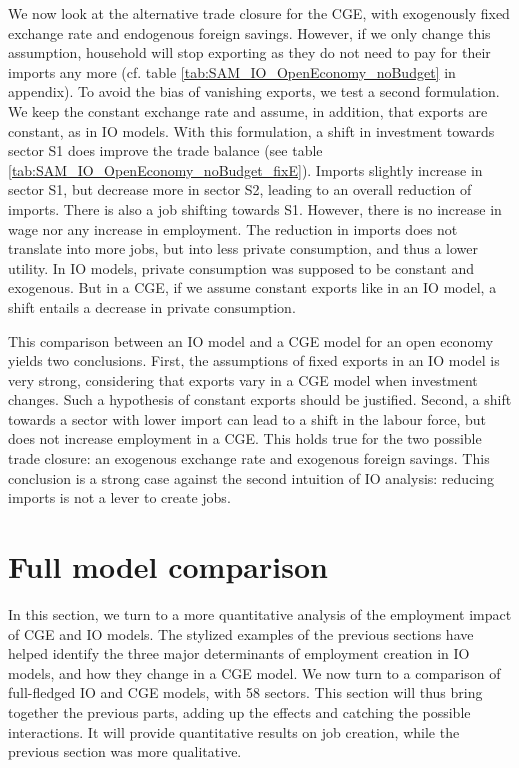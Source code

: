 We now look at the alternative trade closure for the CGE, with exogenously fixed exchange rate and endogenous foreign savings. However, if we only change this assumption, household will stop exporting as they do not need to pay for their imports any more (cf. table \ref{tab:SAM_IO_OpenEconomy_noBudget} in appendix). 
To avoid the bias of vanishing exports, we test a second formulation. We keep the constant exchange rate and assume, in addition, that exports are constant, as in IO models. With this formulation, a shift in investment towards sector S1 does improve the trade balance (see table \ref{tab:SAM_IO_OpenEconomy_noBudget_fixE}). 
Imports slightly increase in sector S1, but decrease more in sector S2, leading to an overall reduction of imports. There is also a job shifting towards S1.
However, there is no increase in wage nor any increase in employment. The reduction in imports does not translate into more jobs, but into less private consumption, and thus a lower utility.
In IO models, private consumption was supposed to be constant and exogenous. But in a CGE, if we assume constant exports like in an IO model, a shift entails a decrease in private consumption.

This comparison between an IO model and a CGE model for an open economy yields two conclusions. 
First, the assumptions of fixed exports in an IO model is very strong, considering that exports vary in a CGE model when investment changes. Such a hypothesis of constant exports should be justified. 
Second, a shift towards a sector with lower import can lead to a shift in the labour force, but does not increase employment in a CGE. This holds true for the two possible trade closure: an exogenous exchange rate and exogenous foreign savings.
This conclusion is a strong case against the second intuition of IO analysis: reducing imports is not a lever to create jobs. 


\section{Full model comparison} \label{sec:fullModel}

In this section, we turn to a more quantitative analysis of the employment impact of CGE and IO models.
The stylized examples of the previous sections have helped identify the three major determinants of employment creation in IO models, and how they change in a CGE model.
We now turn to a comparison of full-fledged IO and CGE models, with 58 sectors.
This section will thus bring together the previous parts, adding up the effects and catching the possible interactions. It will provide quantitative results on job creation, while the previous section was more qualitative. 

